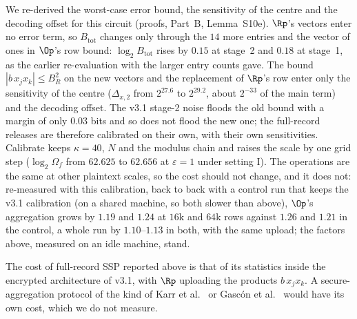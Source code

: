 We re-derived the worst-case error bound, the sensitivity of the centre and the decoding offset for this circuit (proofs, Part~B, Lemma~S10e). $\Rp$'s vectors enter no error term, so $B_{\mathrm{tot}}$ changes only through the $14$ more entries and the vector of ones in $\Op$'s row bound: $\log_2 B_{\mathrm{tot}}$ rises by $0.15$ at stage~2 and $0.18$ at stage~1, as the earlier re-evaluation with the larger entry counts gave. The bound $|b\,x_jx_k| \le B_R^2$ on the new vectors and the replacement of $\Rp$'s row enter only the sensitivity of the centre ($\Delta_{x,2}$ from $2^{27.6}$ to $2^{29.2}$, about $2^{-33}$ of the main term) and the decoding offset. The v3.1 stage-2 noise floods the old bound with a margin of only $0.03$ bits and so does not flood the new one; the full-record releases are therefore calibrated on their own, with their own sensitivities. Calibrate keeps $\kappa = 40$, $N$ and the modulus chain and raises the scale by one grid step ($\log_2\Omega_f$ from $62.625$ to $62.656$ at $\varepsilon = 1$ under setting I). The operations are the same at other plaintext scales, so the cost should not change, and it does not: re-measured with this calibration, back to back with a control run that keeps the v3.1 calibration (on a shared machine, so both slower than above), $\Op$'s aggregation grows by $1.19$ and $1.24$ at $16$k and $64$k rows against $1.26$ and $1.21$ in the control, a whole run by $1.10$--$1.13$ in both, with the same upload; the factors above, measured on an idle machine, stand.

The cost of full-record SSP reported above is that of its statistics inside the encrypted architecture of v3.1, with $\Rp$ uploading the products $b\,x_jx_k$. A secure-aggregation protocol of the kind of Karr et al.~\cite{karr2009privacy} or Gasc\'on et al.~\cite{gascon2017privacy} would have its own cost, which we do not measure.

